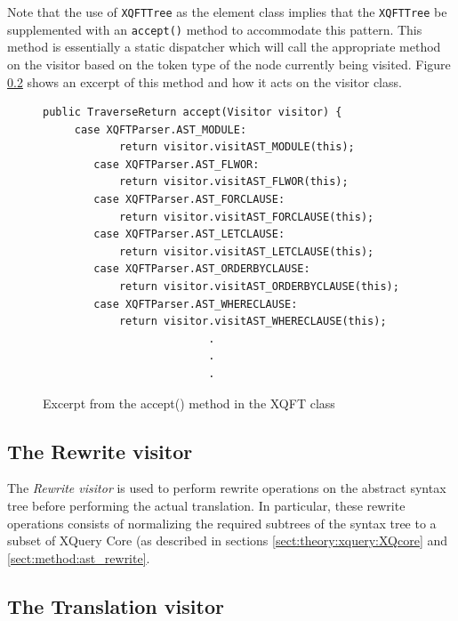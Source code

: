Note that the use of \texttt{XQFTTree} as the element class implies that the
\texttt{XQFTTree} be supplemented with an \texttt{accept()} method to
accommodate this pattern. This method is essentially a static dispatcher which
will call the appropriate method on the visitor based on the token type of the
node currently being visited. Figure \ref{} shows an excerpt of this method and
how it acts on the visitor class.

\begin{figure}[htp]
\begin{center}
  \begin{Verbatim}	
public TraverseReturn accept(Visitor visitor) {
     case XQFTParser.AST_MODULE:
            return visitor.visitAST_MODULE(this);
        case XQFTParser.AST_FLWOR:
            return visitor.visitAST_FLWOR(this);
        case XQFTParser.AST_FORCLAUSE:
            return visitor.visitAST_FORCLAUSE(this);
        case XQFTParser.AST_LETCLAUSE:
            return visitor.visitAST_LETCLAUSE(this);
        case XQFTParser.AST_ORDERBYCLAUSE:
            return visitor.visitAST_ORDERBYCLAUSE(this);
        case XQFTParser.AST_WHERECLAUSE:
            return visitor.visitAST_WHERECLAUSE(this);
                          .
                          .
                          .
  \end{Verbatim}
  \caption{Excerpt from the accept() method in the XQFT class}
  \label{figureLabel}
\end{center}
\end{figure}

\subsection{The Rewrite visitor}
The \textit{Rewrite visitor} is used to perform rewrite operations on the
abstract syntax tree before performing the actual translation. In particular,
these rewrite operations consists of normalizing the required subtrees of the
syntax tree to a subset of XQuery Core (as described in sections
\ref{sect:theory:xquery:XQcore} and \ref{sect:method:ast_rewrite}.

\subsection{The Translation visitor}
